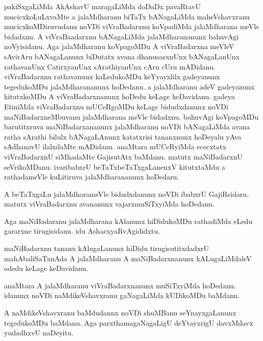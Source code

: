\documentclass{article}
\begin{document}
\begin{mn}%
pakiSxgaLiMda AkAshavU maragaLiMda doDaDx pavaRtavU mucicxkoLuLxvaMte a jalaMdharanu biTaTx 
bANagaLiMda maheVshavxranu mucicxkoMDiruvudanu noVDi viVraBadarxnu koVpadiMda jalaMdharana 
meVle bidadxnu. A viVraBaadarxnu bANagaLiMda jalaMdharananunx bahuvAgi noVyisidanu. Aga 
jalaMdharanu koVpagoMDu A viVraBadarxna meVleV sAvirAru bANagaLanunx biDutatx avana 
dhanusasxnUnx bANagaLanUnx rathavanUnx CatirxyanUnx sArathiyanUnx cAru cUru mADidanu. 
viVraBadarxnu rathavanunx kaLedukoMDu keYyayxlilx gadeyanunx tegedukoMDu jalaMdharananunx 
hoDedanu. a jalaMdharanu adeV gadeyanunx kitutxkoMDu A viVraBadarxnanunx hoDedu keLage 
keDavidanu. gadeya EtiniMda viVraBadarxnu mUCeRgoMDu keLage bidudxdanunx noVDi 
maNiBadarxneMbuvanu jalaMdharana meVle bidadxnu. bahuvAgi koVpagoMDu barutitxruva 
maNiBadarxananunx jalaMdharanu noVDi bANagaLiMda avana ratha sArathi bilulx bANagaLAnunx 
katatxrisi tananxnunx hoDeyalu yAva sAdhanavU ilalxdaMte mADidanu. anaMtara mUCeRyiMda 
ececxtatx viVraBadarxnU siMhadaMte GajisutAtx baMdanu. matutx maNiBadarxnU seVrikoMDanu. 
ivaribabxrU beTaTxbeTaTxgaLanenxV kitutxtaMdu a rathadameVle kuLitiruva jalaMdharananunx 
hoDedaru.
\end{mn}

\begin{mn}%
A beTaTxgaLu jalaMdharameVle bidudxdanunx noVDi ibabxrU GajiRsidaru. matutx viVraBadarxnu 
avananunx vajarxmuSiTxyiMda hoDedanu.
\end{mn}

\begin{mn}%
Aga maNiBadarxnu jalaMdharana kAlanunx hiDidukoMDu rathadiMda eLedu gararxne tirugisidanu. 
idu AshacxyaRvAgididxtu.
\end{mn}

\begin{mn}%
maNiBadarxnu tananx kAlugaLanunx hiDidu tirugisutitxdadxrU mahAbaliSaTxnAda A jalaMdharanu A 
maNiBadarxnanunx kALugaLiMdaleV odedu keLage keDavidanu.
\end{mn}

\begin{mn}%
anaMtara A jalaMdharanu viVraBadarxnanunx muSiTxyiMda hoDedanu. idanunx noVDi 
naMdikeVshavxranu gaNagaLiMda kUDikoMDu baMdanu.
\end{mn}

\begin{mn}%
A naMdikeVshavxranu baMdudannx noVDi shuMBanu seYnayxgaLanunx tegedukoMDu baMdanu. Aga 
parxthamagaNagaLigU deYtayxrigU davxMdavx yudadhxvU naDeyitu.
\end{mn}
\end{document}
